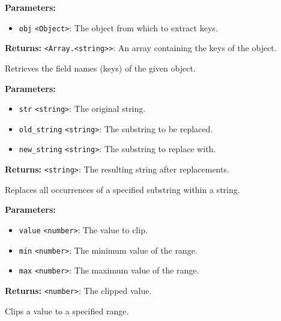 \documentclass[12pt,a4paper]{article}
\begin{document}
\noindent \textbf{Parameters:}
\begin{itemize}
  \item \texttt{obj} \texttt{<Object>}: The object from which to extract keys.
\end{itemize}

\noindent \textbf{Returns:} \texttt{<Array.<string>>}: An array containing the keys of the object.

\noindent Retrieves the field names (keys) of the given object.

\vspace{5mm}
\noindent {}


\noindent \textbf{Parameters:}
\begin{itemize}
  \item \texttt{str} \texttt{<string>}: The original string.
  \item \texttt{old\_string} \texttt{<string>}: The substring to be replaced.
  \item \texttt{new\_string} \texttt{<string>}: The substring to replace with.
\end{itemize}

\noindent \textbf{Returns:} \texttt{<string>}: The resulting string after replacements.

\noindent Replaces all occurrences of a specified substring within a string.

\vspace{5mm}
\noindent {}


\noindent \textbf{Parameters:}
\begin{itemize}
  \item \texttt{value} \texttt{<number>}: The value to clip.
  \item \texttt{min} \texttt{<number>}: The minimum value of the range.
  \item \texttt{max} \texttt{<number>}: The maximum value of the range.
\end{itemize}

\noindent \textbf{Returns:} \texttt{<number>}: The clipped value.

\noindent Clips a value to a specified range.

\vspace{5mm}
\noindent {}
\end{document}
